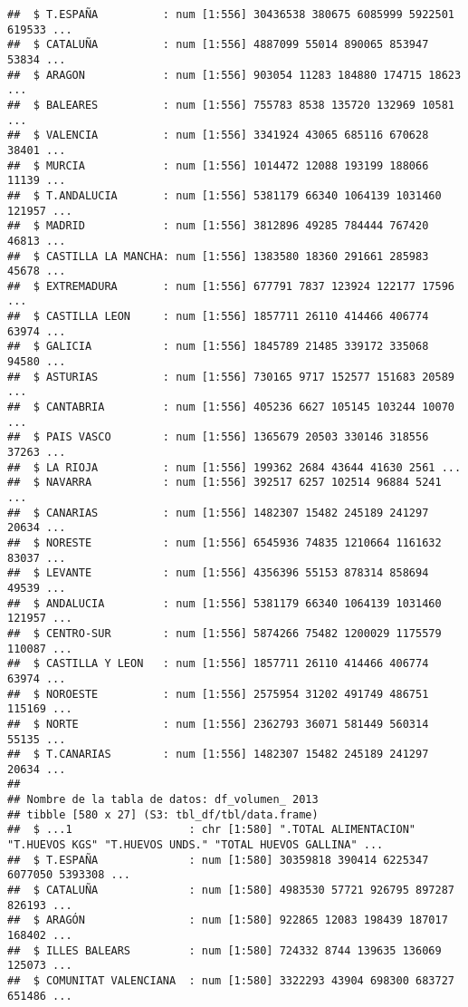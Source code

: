 \documentclass[
]{article}
\begin{document}
\begin{verbatim}
##  $ T.ESPAÑA          : num [1:556] 30436538 380675 6085999 5922501 619533 ...
##  $ CATALUÑA          : num [1:556] 4887099 55014 890065 853947 53834 ...
##  $ ARAGON            : num [1:556] 903054 11283 184880 174715 18623 ...
##  $ BALEARES          : num [1:556] 755783 8538 135720 132969 10581 ...
##  $ VALENCIA          : num [1:556] 3341924 43065 685116 670628 38401 ...
##  $ MURCIA            : num [1:556] 1014472 12088 193199 188066 11139 ...
##  $ T.ANDALUCIA       : num [1:556] 5381179 66340 1064139 1031460 121957 ...
##  $ MADRID            : num [1:556] 3812896 49285 784444 767420 46813 ...
##  $ CASTILLA LA MANCHA: num [1:556] 1383580 18360 291661 285983 45678 ...
##  $ EXTREMADURA       : num [1:556] 677791 7837 123924 122177 17596 ...
##  $ CASTILLA LEON     : num [1:556] 1857711 26110 414466 406774 63974 ...
##  $ GALICIA           : num [1:556] 1845789 21485 339172 335068 94580 ...
##  $ ASTURIAS          : num [1:556] 730165 9717 152577 151683 20589 ...
##  $ CANTABRIA         : num [1:556] 405236 6627 105145 103244 10070 ...
##  $ PAIS VASCO        : num [1:556] 1365679 20503 330146 318556 37263 ...
##  $ LA RIOJA          : num [1:556] 199362 2684 43644 41630 2561 ...
##  $ NAVARRA           : num [1:556] 392517 6257 102514 96884 5241 ...
##  $ CANARIAS          : num [1:556] 1482307 15482 245189 241297 20634 ...
##  $ NORESTE           : num [1:556] 6545936 74835 1210664 1161632 83037 ...
##  $ LEVANTE           : num [1:556] 4356396 55153 878314 858694 49539 ...
##  $ ANDALUCIA         : num [1:556] 5381179 66340 1064139 1031460 121957 ...
##  $ CENTRO-SUR        : num [1:556] 5874266 75482 1200029 1175579 110087 ...
##  $ CASTILLA Y LEON   : num [1:556] 1857711 26110 414466 406774 63974 ...
##  $ NOROESTE          : num [1:556] 2575954 31202 491749 486751 115169 ...
##  $ NORTE             : num [1:556] 2362793 36071 581449 560314 55135 ...
##  $ T.CANARIAS        : num [1:556] 1482307 15482 245189 241297 20634 ...
##  
## Nombre de la tabla de datos: df_volumen_ 2013 
## tibble [580 x 27] (S3: tbl_df/tbl/data.frame)
##  $ ...1                  : chr [1:580] ".TOTAL ALIMENTACION" "T.HUEVOS KGS" "T.HUEVOS UNDS." "TOTAL HUEVOS GALLINA" ...
##  $ T.ESPAÑA              : num [1:580] 30359818 390414 6225347 6077050 5393308 ...
##  $ CATALUÑA              : num [1:580] 4983530 57721 926795 897287 826193 ...
##  $ ARAGÓN                : num [1:580] 922865 12083 198439 187017 168402 ...
##  $ ILLES BALEARS         : num [1:580] 724332 8744 139635 136069 125073 ...
##  $ COMUNITAT VALENCIANA  : num [1:580] 3322293 43904 698300 683727 651486 ...

\end{verbatim}
\end{document}
